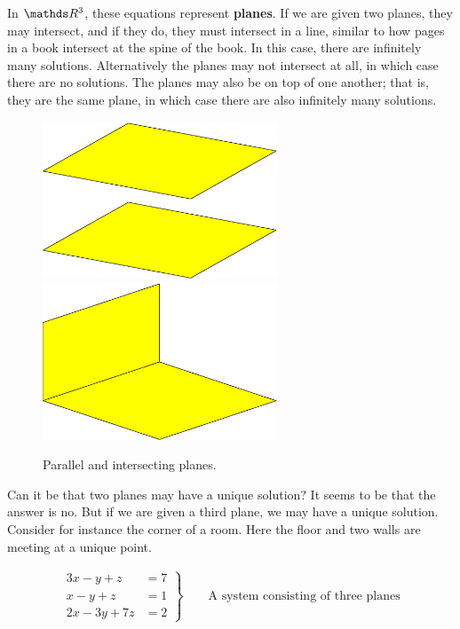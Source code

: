 \documentclass[11pt]{article}
\newcommand{\keyphrase}{\textbf}
\begin{document}
In $\bbR^3$, these equations represent \keyphrase{planes}. If we are given two planes, they may intersect, and if they do, they must intersect in a line, similar to how pages in a book intersect at the spine of the book. In this case, there are infinitely many solutions. Alternatively the planes may not intersect at all, in which case there are no solutions. The planes may also be on top of one another; that is, they are the same plane, in which case there are also infinitely many solutions.

\begin{figure}[H]
\centering
\includegraphics[width=7cm]{parallelplanes.eps}
\hspace{.5cm}
\includegraphics[width=7cm]{intersectingplanes.eps}
\caption{Parallel and intersecting planes.}
\end{figure}

Can it be that two planes may have a unique solution? It seems to be that the answer is no. But if we are given a third plane, we may have a unique solution. Consider for instance the corner of a room. Here the floor and two walls are meeting at a unique point.

\begin{align*}
\left.
\begin{aligned}
3x - y + z &= 7
\\
x - y + z &= 1
\\
2x - 3y + 7z &= 2
\end{aligned}
\right\}
\qquad
\text{A system consisting of three planes}
\end{align*}
\end{document}
